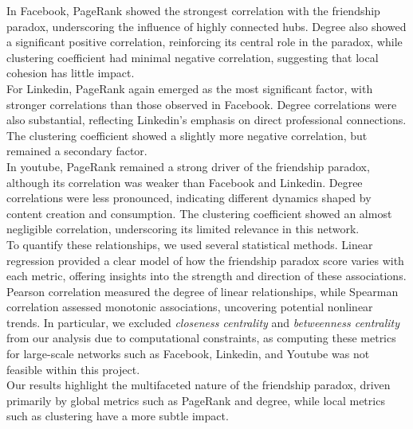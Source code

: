 \documentclass{article}
\begin{document}
In Facebook, PageRank showed the strongest correlation with the friendship paradox, underscoring the influence of highly connected hubs. Degree also showed a significant positive correlation, reinforcing its central role in the paradox, while clustering coefficient had minimal negative correlation, suggesting that local cohesion has little impact. \\
For Linkedin, PageRank again emerged as the most significant factor, with stronger correlations than those observed in Facebook. Degree correlations were also substantial, reflecting Linkedin's emphasis on direct professional connections. The clustering coefficient showed a slightly more negative correlation, but remained a secondary factor. \\ 
In youtube, PageRank remained a strong driver of the friendship paradox, although its correlation was weaker than Facebook and Linkedin. Degree correlations were less pronounced, indicating different dynamics shaped by content creation and consumption. The clustering coefficient showed an almost negligible correlation, underscoring its limited relevance in this network. \\

To quantify these relationships, we used several statistical methods. 
Linear regression provided a clear model of how the friendship paradox score varies with each metric, offering insights into the strength and direction of these associations. 
Pearson correlation measured the degree of linear relationships, while Spearman correlation assessed monotonic associations, uncovering potential nonlinear trends. In particular, we excluded \textit{closeness centrality} and \textit{betweenness centrality} from our analysis due to computational constraints, as computing these metrics for large-scale networks such as Facebook, Linkedin, and Youtube was not feasible within this project. \\
Our results highlight the multifaceted nature of the friendship paradox, driven primarily by global metrics such as PageRank and degree, while local metrics such as clustering have a more subtle impact.
\end{document}

